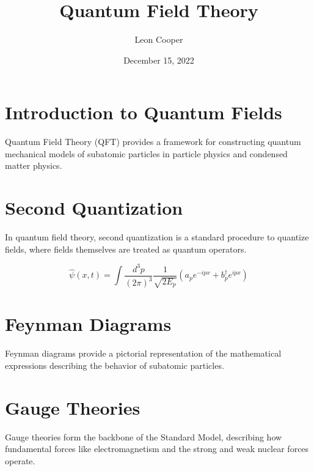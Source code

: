 \documentclass{article}
\title{Quantum Field Theory}
\author{Leon Cooper}
\date{December 15, 2022}
\begin{document}
\maketitle

\section{Introduction to Quantum Fields}
Quantum Field Theory (QFT) provides a framework for constructing quantum mechanical models of subatomic particles in particle physics and condensed matter physics.

\section{Second Quantization}
In quantum field theory, second quantization is a standard procedure to quantize fields, where fields themselves are treated as quantum operators.

\begin{equation}
\hat{\psi}(x,t) = \int \frac{d^3p}{(2\pi)^3} \frac{1}{\sqrt{2E_p}} \left( a_p e^{-ipx} + b_p^\dagger e^{ipx} \right)
\end{equation}

\section{Feynman Diagrams}
Feynman diagrams provide a pictorial representation of the mathematical expressions describing the behavior of subatomic particles.

\section{Gauge Theories}
Gauge theories form the backbone of the Standard Model, describing how fundamental forces like electromagnetism and the strong and weak nuclear forces operate.
\end{document}
